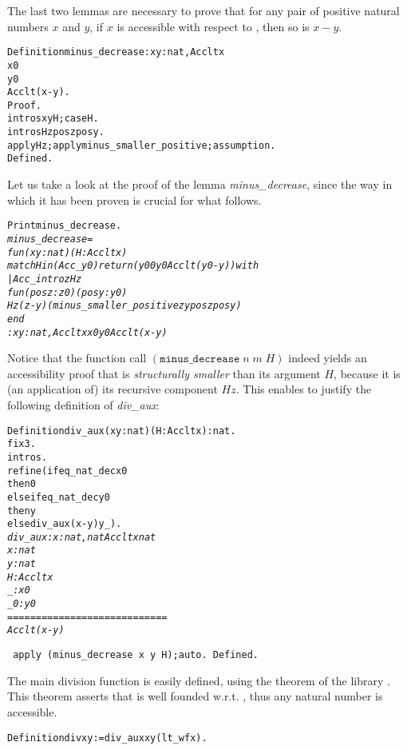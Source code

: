 \documentclass[11pt]{article}
\begin{document}
\noindent The last two lemmas are necessary to prove that for any pair
of positive natural numbers $x$ and $y$, if $x$ is accessible with
respect to , then so is $x-y$.

\begin{alltt}
Definition minus_decrease : {\prodsym} x y:nat, Acc lt x {\arrow} 
                                         x {\coqdiff} 0 {\arrow} 
                                         y {\coqdiff} 0 {\arrow}
                                         Acc lt (x-y).
Proof.
 intros x y H; case H.
 intros Hz posz posy. 
 apply Hz; apply minus_smaller_positive; assumption.
Defined.
\end{alltt}

Let us take a look at the proof of the lemma \textsl{minus\_decrease}, since
the way in which it has been proven is crucial for what follows.
\begin{alltt}
Print minus_decrease.
\it
minus_decrease = 
fun (x y : nat) (H : Acc lt x) {\funarrow}
match H in (Acc _ y0) return (y0 {\coqdiff} 0 {\arrow} y {\coqdiff} 0 {\arrow} Acc lt (y0 - y)) with
| Acc_intro z Hz {\funarrow}
    fun (posz : z {\coqdiff} 0) (posy : y {\coqdiff} 0) {\funarrow}
    Hz (z - y) (minus_smaller_positive z y posz posy)
end
     : {\prodsym} x y : nat, Acc lt x {\arrow} x {\coqdiff} 0 {\arrow} y {\coqdiff} 0 {\arrow} Acc lt (x - y)

\end{alltt}
\noindent Notice that the function call 
$(\texttt{minus\_decrease}\;n\;m\;H)$
indeed yields an accessibility proof that is \textsl{structurally
smaller} than its argument $H$, because it is (an application of) its
recursive component $Hz$.  This enables to justify the following
definition of \textsl{div\_aux}:

\begin{alltt}
Definition div_aux (x y:nat)(H: Acc lt x):nat.
 fix 3.
 intros.
 refine (if eq_nat_dec x 0 
         then 0 
         else if eq_nat_dec y 0 
              then y
              else div_aux (x-y) y _).
\it
 div_aux : {\prodsym} x : nat, nat {\arrow} Acc lt x {\arrow} nat
  x : nat
  y : nat
  H : Acc lt x
  _ : x {\coqdiff} 0
  _0 : y {\coqdiff} 0
  ============================
   Acc lt (x - y)

\tt
 apply (minus_decrease x y H);auto. 
Defined.
\end{alltt}

The main division function is easily defined, using the theorem
 of the library . This theorem asserts that
 is well founded w.r.t. , thus any natural number
is accessible.
\begin{alltt}
Definition div x y := div_aux x y (lt_wf x). 
\end{alltt}
\end{document}
